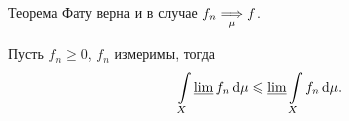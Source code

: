 \begin{corollary}
    
    Теорема Фату верна и в случае $f_n \underset{\mu}{\Longrightarrow} f$.
\end{corollary}

\begin{corollary}
    
    Пусть $f_n \geqslant 0$, $f_n$ измеримы, тогда
\[
    \int\limits_{X}{\varliminf{f_n} \,\mathrm{d}\mu} \leqslant \varliminf{\int\limits_{X}{f_n \,\mathrm{d}\mu}}
.\] 
\end{corollary}
